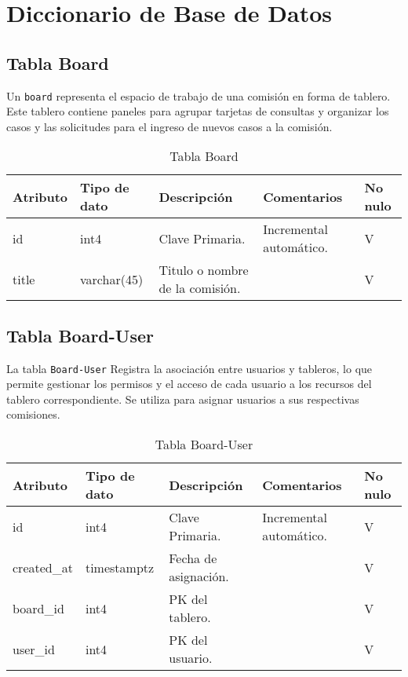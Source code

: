 \chapter{Diccionario de Base de Datos}\label{cap:dict-db}


\section{Tabla Board}\label{sec:table-board}
Un \texttt{board} representa el espacio de trabajo de una comisión en forma de tablero. Este tablero contiene paneles para agrupar tarjetas de consultas y organizar los casos y las solicitudes para el ingreso de nuevos casos a la comisión.

\begin{table}[htbp]
\centering
\label{tab:board}

\begin{tabular}{|p{3cm}|p{2.5cm}|p{4.5cm}|p{4cm}|p{1cm}|}
\hline
\textbf{Atributo} & \textbf{Tipo de dato}  & \textbf{Descripción} & \textbf{Comentarios} & \textbf{No nulo} \\ \hline
id & int4 & Clave Primaria. & Incremental automático. & V \\ \hline
title & varchar(45) & Titulo o nombre de la comisión. &  & V \\ \hline
\end{tabular}
\caption{Tabla Board}
\end{table}



\section{Tabla Board-User}\label{sec:table-board-user}
La tabla \texttt{Board-User} Registra la asociación entre usuarios y tableros, lo que permite gestionar los permisos y el acceso de cada usuario a los recursos del tablero correspondiente. Se utiliza para asignar usuarios a sus respectivas comisiones.


\begin{table}[htbp]
\centering
\label{tab:board-user}

\begin{tabular}{|p{3cm}|p{2.5cm}|p{4.5cm}|p{4cm}|p{1cm}|}
\hline
\textbf{Atributo} & \textbf{Tipo de dato}  & \textbf{Descripción} & \textbf{Comentarios} & \textbf{No nulo} \\ \hline
id & int4 & Clave Primaria. & Incremental automático. & V \\ \hline
created\_at & timestamptz & Fecha de asignación. &  & V \\ \hline
board\_id & int4 & PK del tablero. &  & V \\ \hline
user\_id & int4 & PK del usuario. &  & V \\ \hline
\end{tabular}
\caption{Tabla Board-User}
\end{table}



